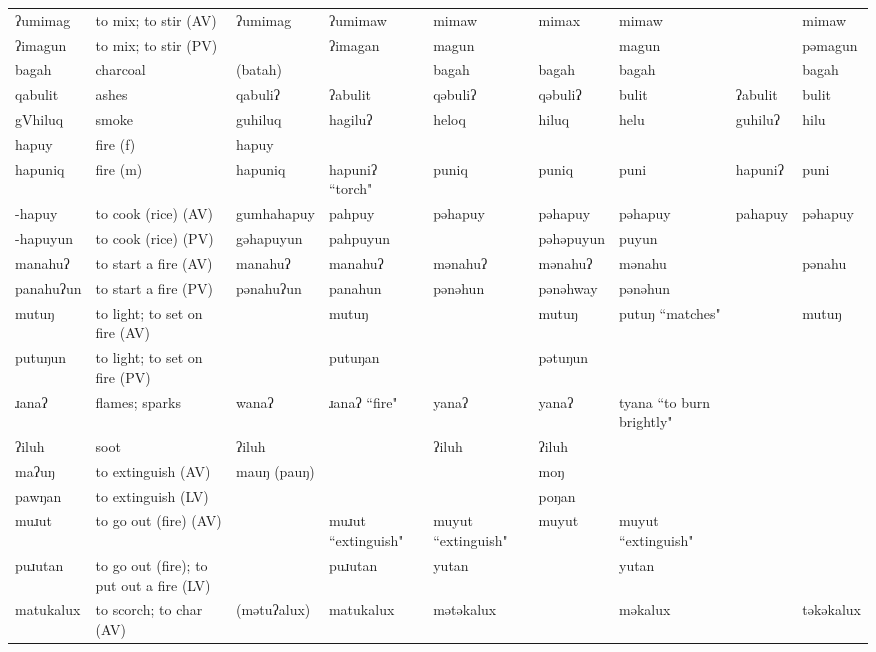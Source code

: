 \begin{landscape}
\begin{longtable}{*{9}{p{}}}
\text{*}ʔumimag & to mix; to stir (AV) & ʔumimag & ʔumimaw & mimaw & mimax & mimaw &  & mimaw\\
\text{*}ʔimagun & to mix; to stir (PV) &  & ʔimagan & magun &  & magun &  & pəmagun\\
\text{*}bagah & charcoal & (batah) &  & bagah & bagah & bagah &  & bagah\\
\text{*}qabulit & ashes & qabuliʔ & ʔabulit & qəbuliʔ & qəbuliʔ & bulit & ʔabulit & bulit\\
\text{*}gVhiluq & smoke & guhiluq & hagiluʔ & heloq & hiluq & helu & guhiluʔ & hilu\\
\text{*}hapuy & fire (f) & hapuy &  &  &  &  &  & \\
\text{*}hapuniq & fire (m) & hapuniq & hapuniʔ ``torch" & puniq & puniq & puni & hapuniʔ & puni\\
\text{*}-hapuy & to cook (rice) (AV) & gumhahapuy & pahpuy & pəhapuy & pəhapuy & pəhapuy & pahapuy & pəhapuy\\
\text{*}-hapuyun & to cook (rice) (PV) & gəhapuyun & pahpuyun &  & pəhəpuyun & puyun &  & \\
\text{*}manahuʔ & to start a fire (AV) & manahuʔ & manahuʔ & mənahuʔ & mənahuʔ & mənahu &  & pənahu\\
\text{*}panahuʔun & to start a fire (PV) & pənahuʔun & panahun & pənəhun & pənəhway & pənəhun &  & \\
\text{*}mutuŋ & to light; to set on fire (AV) &  & mutuŋ &  & mutuŋ & putuŋ ``matches" &  & mutuŋ\\
\text{*}putuŋun & to light; to set on fire (PV) &  & putuŋan &  & pətuŋun &  &  & \\
\text{*}ɹanaʔ & flames; sparks & wanaʔ & ɹanaʔ ``fire" & yanaʔ & yanaʔ & tyana ``to burn brightly" &  & \\
\text{*}ʔiluh & soot & ʔiluh &  & ʔiluh & ʔiluh &  &  & \\
\text{*}maʔuŋ & to extinguish (AV) & mauŋ (pauŋ) &  &  & moŋ &  &  & \\
\text{*}pawŋan & to extinguish (LV) &  &  &  & poŋan &  &  & \\
\text{*}muɹut & to go out (fire) (AV) &  & muɹut ``extinguish" & muyut ``extinguish" & muyut & muyut ``extinguish" &  & \\
\text{*}puɹutan & to go out (fire); to put out a fire (LV) &  & puɹutan & yutan &  & yutan &  & \\
\text{*}matukalux & to scorch; to char (AV) & (mətuʔalux) & matukalux & mətəkalux &  & məkalux &  & təkəkalux\\

\end{longtable}
\end{landscape}

